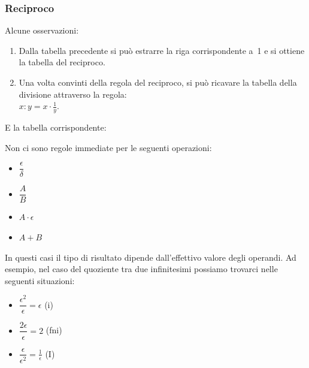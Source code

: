 \subsubsection{Reciproco}
\label{subsec:insnum_reciproco}

\begin{multicols}{2}
Alcune osservazioni:
\begin{enumerate} [noitemsep]
 \item Dalla tabella precedente si può estrarre la riga corrispondente a~1
e si ottiene la tabella del reciproco.
 \item Una volta convinti della regola del reciproco, si può ricavare la 
tabella della divisione attraverso la 
regola:\\
$x : y = x \cdot \frac{1}{y}$.
\end{enumerate}
E la tabella corrispondente:
\begin{center}
\renewcommand{\arraystretch}{.0}
\end{center}
\end{multicols}

\begin{osservazione}
Non ci sono regole immediate per le seguenti operazioni:
\begin{multicols}{4}
\begin{itemize} [nosep]
 \item \(\dfrac{\epsilon}{\delta}\)
 \item \(\dfrac{A}{B}\)
 \item \(A \cdot \epsilon\)
 \item \(A + B\)
\end{itemize}
\end{multicols}
In questi casi il tipo di risultato dipende dall'effettivo valore degli 
operandi. Ad esempio, nel caso del quoziente tra due infinitesimi possiamo 
trovarci nelle seguenti situazioni:
\begin{multicols}{3}
\begin{itemize} [nosep]
 \item \(\dfrac{\epsilon^2}{\epsilon} = \epsilon\) \quad (i)
 \item \(\dfrac{2\epsilon}{\epsilon} = 2\) \quad (fni)
 \item \(\dfrac{\epsilon}{\epsilon^2} = \frac{1}{\epsilon}\) \quad (I)
\end{itemize}
\end{multicols}
\end{osservazione}

